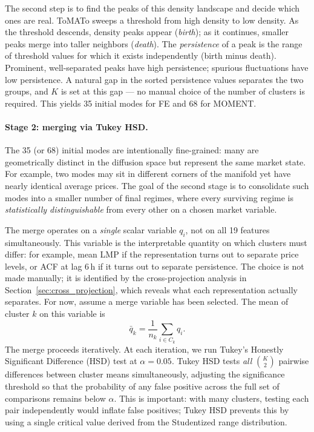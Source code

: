 \documentclass[12pt]{article}
\begin{document}
The second step is to find the peaks of this density landscape and decide which ones are real.
ToMATo sweeps a threshold from high density to low density.
As the threshold descends, density peaks appear (\emph{birth}); as it continues, smaller peaks merge into taller neighbors (\emph{death}).
The \emph{persistence} of a peak is the range of threshold values for which it exists independently (birth minus death).
Prominent, well-separated peaks have high persistence; spurious fluctuations have low persistence.
A natural gap in the sorted persistence values separates the two groups, and $K$ is set at this gap --- no manual choice of the number of clusters is required.
This yields 35 initial modes for FE and 68 for MOMENT.

\paragraph{Stage 2: merging via Tukey HSD.}
The 35 (or 68) initial modes are intentionally fine-grained: many are geometrically distinct in the diffusion space but represent the same market state.
For example, two modes may sit in different corners of the manifold yet have nearly identical average prices.
The goal of the second stage is to consolidate such modes into a smaller number of final regimes, where every surviving regime is \emph{statistically distinguishable} from every other on a chosen market variable.

The merge operates on a \emph{single} scalar variable $q_i$, not on all 19 features simultaneously.
This variable is the interpretable quantity on which clusters must differ: for example, mean LMP if the representation turns out to separate price levels, or ACF at lag 6\,h if it turns out to separate persistence.
The choice is not made manually; it is identified by the cross-projection analysis in Section~\ref{sec:cross_projection}, which reveals what each representation actually separates.
For now, assume a merge variable has been selected.
The mean of cluster $k$ on this variable is
\begin{equation}
\bar{q}_k =
\frac{1}{n_k}\sum_{i \in C_k} q_i.
\label{eq:merge_mean}
\end{equation}
The merge proceeds iteratively.
At each iteration, we run Tukey's Honestly Significant Difference (HSD) test \citep{tukey1949} at $\alpha = 0.05$.
Tukey HSD tests \emph{all} $\binom{K}{2}$ pairwise differences between cluster means simultaneously, adjusting the significance threshold so that the probability of any false positive across the full set of comparisons remains below $\alpha$.
This is important: with many clusters, testing each pair independently would inflate false positives; Tukey HSD prevents this by using a single critical value derived from the Studentized range distribution.
\end{document}
